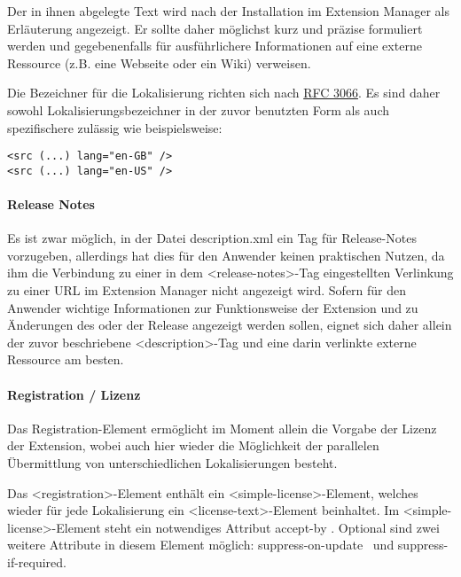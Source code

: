 \documentclass[a4paper,10pt,pagesize,titlepage]{scrbook}
\begin{document}
Der in ihnen abgelegte Text wird nach der Installation im Extension Manager als Erläuterung angezeigt. Er sollte daher möglichst kurz und präzise formuliert werden und gegebenenfalls für ausführlichere Informationen auf eine externe Ressource (z.B. eine Webseite oder ein Wiki) verweisen.

Die Bezeichner für die Lokalisierung richten sich nach \href{https://tools.ietf.org/html/rfc3066}{RFC 3066}. Es sind daher sowohl Lokalisierungsbezeichner in der zuvor benutzten Form als auch spezifischere zulässig wie beispielsweise:
\begin{lstlisting}
<src (...) lang="en-GB" />
<src (...) lang="en-US" />
\end{lstlisting}

\paragraph*{Release Notes}$~~$\\

Es ist zwar möglich, in der Datei description.xml ein Tag für Release-Notes vorzugeben, allerdings hat dies für den Anwender keinen praktischen Nutzen, da ihm die Verbindung zu einer in dem <release-notes>-Tag eingestellten Verlinkung zu einer URL im Extension Manager nicht angezeigt wird. Sofern für den Anwender wichtige Informationen zur Funktionsweise der Extension und zu Änderungen des oder der Release angezeigt werden sollen, eignet sich daher allein der zuvor beschriebene <description>-Tag und eine darin verlinkte externe Ressource am besten.


\newpage
\paragraph*{Registration / Lizenz}$~~$\\

Das Registration-Element ermöglicht im Moment allein die Vorgabe der Lizenz der Extension, wobei auch hier wieder die Möglichkeit der parallelen Übermittlung von unterschiedlichen Lokalisierungen besteht.

Das <registration>-Element enthält ein <simple-license>-Element, welches wieder für jede Lokalisierung ein <license-text>-Element beinhaltet. Im <simple-license>-Element steht ein notwendiges Attribut \glqq accept-by \grqq . Optional sind zwei weitere Attribute in diesem Element möglich: \glqq suppress-on-update\grqq~ und \glqq suppress-if-required\grqq .\\
\end{document}
